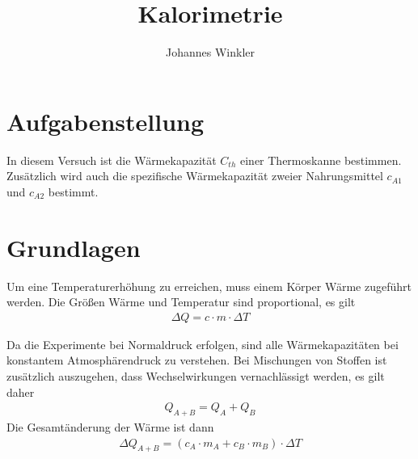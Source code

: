 \documentclass{article}
\title{Kalorimetrie}
\author{Johannes Winkler}
\date{}
\begin{document}
 
 
 
\pagestyle{fancy}


\tableofcontents

\newpage





\section{Aufgabenstellung}

In diesem Versuch ist die Wärmekapazität $C_{th}$ einer Thermoskanne bestimmen. Zusätzlich wird auch die spezifische Wärmekapazität zweier Nahrungsmittel $c_{A1}$ und $c_{A2}$ bestimmt.	


\section{Grundlagen}

Um eine Temperaturerhöhung zu erreichen, muss einem Körper Wärme zugeführt werden. Die Größen Wärme und Temperatur sind proportional, es gilt
\begin{align}
\Delta Q = c\cdot m \cdot \Delta T
\end{align}

Da die Experimente bei Normaldruck erfolgen, sind alle Wärmekapazitäten bei konstantem Atmosphärendruck zu verstehen. Bei Mischungen von Stoffen ist zusätzlich auszugehen, dass Wechselwirkungen vernachlässigt werden, es gilt daher
\begin{align}
Q_{A+B} = Q_A + Q_B
\end{align}
Die Gesamtänderung der Wärme ist dann
\begin{align}
\Delta Q_{A+B} = (c_A \cdot m_A + c_B \cdot m_B)\cdot \Delta T
\end{align}
\end{document}
